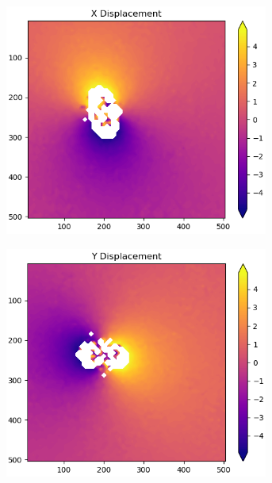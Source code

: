 \documentclass[letterpaper,12pt]{article}
\begin{document}
\begin{figure}[h]
    \centering
    \begin{subfigure}[b]{0.3\textwidth}
    	\centering
        \includegraphics[width=0.95\textwidth]{Python_X_Displacement.PNG}
        \caption{}
        \label{fig:Python_X_Displacement}
    \end{subfigure}
    \begin{subfigure}[b]{0.3\textwidth}
    	\centering
        \includegraphics[width=0.95\textwidth]{Python_Y_Displacement.PNG}

\end{subfigure}
\end{figure}
\end{document}

